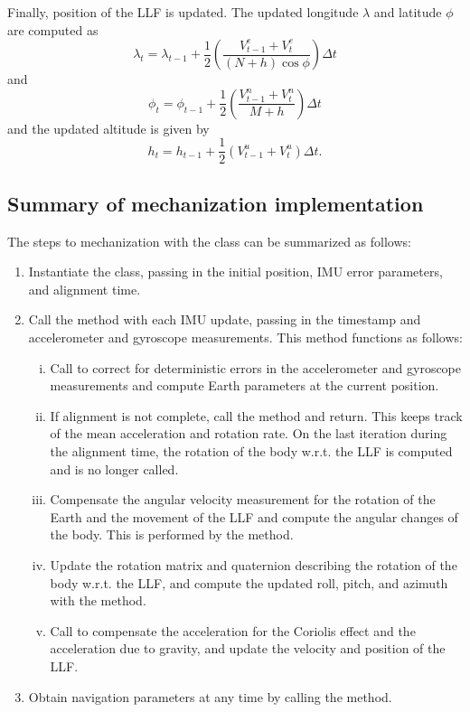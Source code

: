 \documentclass[11pt, oneside]{article}   	%
\begin{document}
Finally, position of the LLF is updated.  The updated longitude $\lambda$ and latitude $\phi$ are computed as
\begin{equation}
\lambda_t=\lambda_{t-1}+\frac12\left(\frac{V^e_{t-1}+V^e_t}{(N+h)\cos\phi}\right)\Delta t
\end{equation}
and
\begin{equation}
\phi_t=\phi_{t-1}+\frac12\left(\frac{V^n_{t-1}+V^n_t}{M+h}\right)\Delta t
\end{equation}
and the updated altitude is given by
\begin{equation}
h_t=h_{t-1}+\frac12\left(V^u_{t-1}+V^u_t\right)\Delta t.
\end{equation}



\subsection{Summary of mechanization implementation}
The steps to mechanization with the  class can be summarized as follows:
\begin{enumerate}
	\item Instantiate the  class, passing in the initial position, IMU error parameters, and alignment time.
	\item Call the  method with each IMU update, passing in the timestamp and accelerometer and gyroscope measurements.  This method functions as follows:
	\begin{enumerate}[i.]
		\item Call  to correct for deterministic errors in the accelerometer and gyroscope measurements and compute Earth parameters at the current position.
		\item If alignment is not complete, call the  method and return. This keeps track of the mean acceleration and rotation rate. On the last iteration during the alignment time, the rotation of the body w.r.t. the LLF is computed and  is no longer called.
		\item Compensate the angular velocity measurement for the rotation of the Earth and the movement of the LLF and compute the angular changes of the body.  This is performed by the  method.
		\item Update the rotation matrix and quaternion describing the rotation of the body w.r.t. the LLF, and compute the updated roll, pitch, and azimuth with the  method.
		\item Call  to compensate the acceleration for the Coriolis effect and the acceleration due to gravity, and update the velocity and position of the LLF.
	\end{enumerate}
	\item Obtain navigation parameters at any time by calling the  method.
\end{enumerate}
\end{document}
